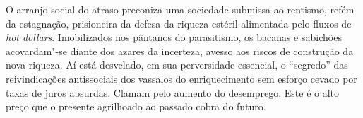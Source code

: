O arranjo social do atraso preconiza uma sociedade submissa ao rentismo,
refém da estagnação, prisioneira da defesa da riqueza estéril alimentada
pelo fluxos de \emph{hot dollars}. Imobilizados nos pântanos do
parasitismo, os bacanas e sabichões acovardam"-se diante dos azares da
incerteza, avesso aos riscos de construção da nova riqueza. Aí está
desvelado, em sua perversidade essencial, o ``segredo'' das
reivindicações antissociais dos vassalos do enriquecimento sem esforço
cevado por taxas de juros absurdas. Clamam pelo aumento do desemprego.
Este é o alto preço que o presente agrilhoado ao passado cobra do
futuro.
